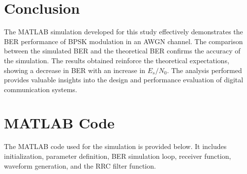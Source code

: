 \documentclass{article}
\begin{document}
\section{Conclusion}
The MATLAB simulation developed for this study effectively demonstrates the BER performance of BPSK modulation in an AWGN channel. The comparison between the simulated BER and the theoretical BER confirms the accuracy of the simulation. The results obtained reinforce the theoretical expectations, showing a decrease in BER with an increase in \(E_s/N_0\). The analysis performed provides valuable insights into the design and performance evaluation of digital communication systems.

\appendix
\section{MATLAB Code}
The MATLAB code used for the simulation is provided below. It includes initialization, parameter definition, BER simulation loop, receiver function, waveform generation, and the RRC filter function.
\end{document}
